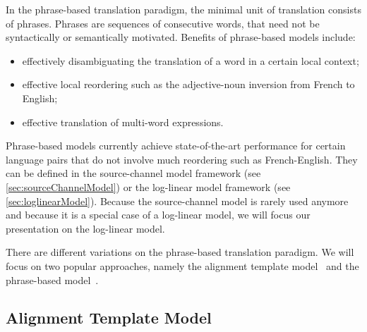 In the phrase-based translation paradigm, the minimal unit of translation consists
of phrases. Phrases are sequences of consecutive words, that need not be syntactically
or semantically motivated.
Benefits of phrase-based models include:
%
\begin{itemize}
  \item effectively disambiguating the translation of a word in a certain local context;
  \item effective local reordering such as the adjective-noun inversion from French to English;
  \item effective translation of multi-word expressions.
\end{itemize}
%
Phrase-based models
currently achieve state-of-the-art performance for
certain language pairs that do not involve much reordering
such as French-English. They can be defined
in the source-channel model framework (see \autoref{sec:sourceChannelModel}) or
the log-linear model framework (see \autoref{sec:loglinearModel}).
Because the source-channel model is rarely used anymore and because it is
a special case of a log-linear model, we will focus our presentation
on the log-linear model.

There are different variations on the phrase-based translation paradigm.
We will focus on two popular approaches, namely the alignment template
model~\citep{och-tillmann-ney:1999:EMNLP,och-ney:2004:CL} and the phrase-based
model~\citep{koehn-och-marcu:2003:NAACL,koehn:2010:book}.

\subsection{Alignment Template Model}

